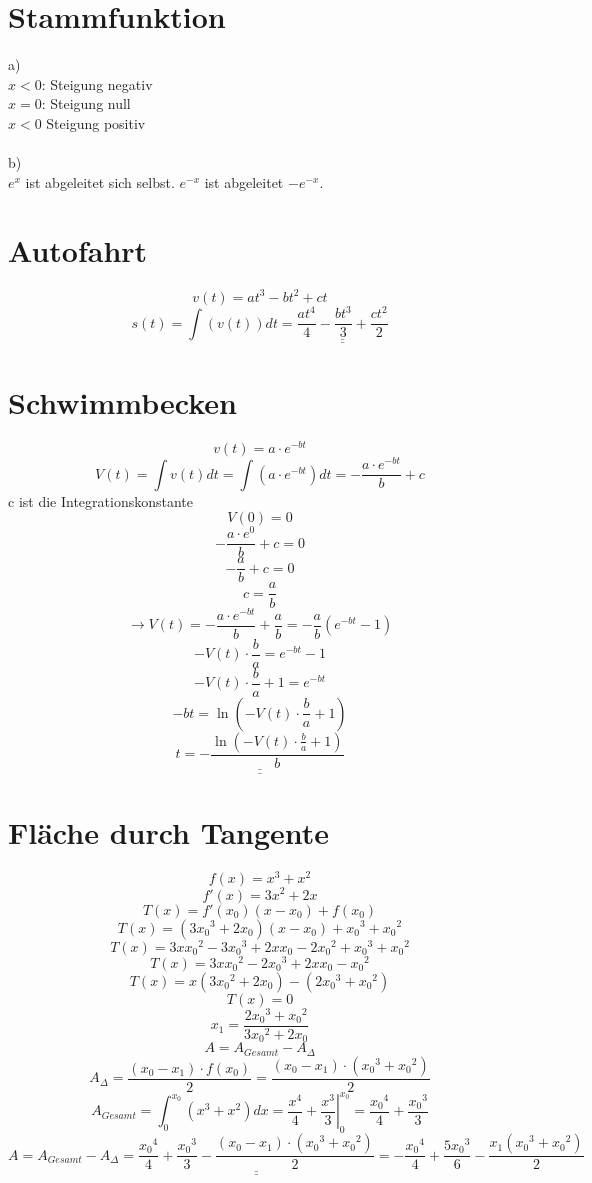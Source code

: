 \section{Stammfunktion}
a)\\
$x<0$: Steigung negativ\\
$x=0$: Steigung null\\
$x<0$ Steigung positiv\\\\
b)\\
$e^x$ ist abgeleitet sich selbst. $e^{-x}$ ist abgeleitet $-e^{-x}$. 

\section{Autofahrt}
\[ v(t) = a t^3 - b t^2 + c t \]
\[ s(t) = \int (v(t)) dt = \underline{\underline{\frac{a t^4}{4} - \frac{b t^3}{3} + \frac{c t^2}{2}}} \]

\section{Schwimmbecken}
\[ v(t) = a \cdot e^{-bt} \]
\[ V(t) = \int v(t) dt = \int \left(a \cdot e^{-bt}\right) dt = -\frac{a \cdot e^{-bt}}{b} + c \]
c ist die Integrationskonstante
\[ V(0) = 0 \]
\[ -\frac{a \cdot e^{0}}{b} + c = 0 \]
\[ -\frac{a}{b} + c = 0 \]
\[ c = \frac{a}{b} \]
\[ \rightarrow V(t) = -\frac{a \cdot e^{-bt}}{b} + \frac{a}{b} = -\frac{a}{b} \left( e^{-bt} - 1 \right) \]
\[ -V(t) \cdot \frac{b}{a} = e^{-bt} - 1 \]
\[ -V(t) \cdot \frac{b}{a} + 1 = e^{-bt} \]
\[ -bt = \ln\left(-V(t) \cdot \frac{b}{a} + 1\right) \]
\[ \underline{\underline{t = -\frac{\ln\left(-V(t) \cdot \frac{b}{a} + 1\right)}{b}}} \]

\section{Fläche durch Tangente}
\[ f(x) = x^3 + x^2 \]
\[ f'(x) = 3 x^2 + 2 x \]
\[ T(x) = f'(x_0)(x - x_0) + f(x_0) \]
\[ T(x) = (3 {x_0}^3 + 2 x_0)(x-x_0) + {x_0}^3 + {x_0}^2 \]
\[ T(x) = 3 x {x_0}^2 - 3 {x_0}^3 + 2 x x_0 - 2 {x_0}^2 + {x_0}^3 + {x_0}^2 \]
\[ T(x) = 3 x {x_0}^2 - 2 {x_0}^3 + 2 x x_0 - {x_0}^2 \]
\[ T(x) = x(3 {x_0}^2 + 2 x_0) - (2 {x_0}^3 + {x_0}^2) \]
\[ T(x) = 0 \]
\[ x_1 = \frac{2 {x_0}^3 + {x_0}^2}{3 {x_0}^2 + 2 x_0} \]
\[ A = A_{Gesamt} - A_\Delta \]
\[ A_\Delta = \frac{(x_0 - x_1) \cdot f(x_0)}{2} = \frac{(x_0 - x_1) \cdot ({x_0}^3 + {x_0}^2)}{2} \]
\[ A_{Gesamt} = \int_0^{x_0} (x^3 + x^2) dx = \left.\frac{x^4}{4} + \frac{x^3}{3} \right|_{0}^{x_0} = \frac{{x_0}^4}{4} + \frac{{x_0}^3}{3} \]
\[ A = A_{Gesamt} - A_\Delta = \underline{\underline{\frac{{x_0}^4}{4} + \frac{{x_0}^3}{3} - \frac{(x_0 - x_1) \cdot ({x_0}^3 + {x_0}^2)}{2}}} = -\frac{{x_0}^4}{4} + \frac{5 {x_0}^3}{6} - \frac{x_1 ({x_0}^3 + {x_0}^2)}{2} \]

